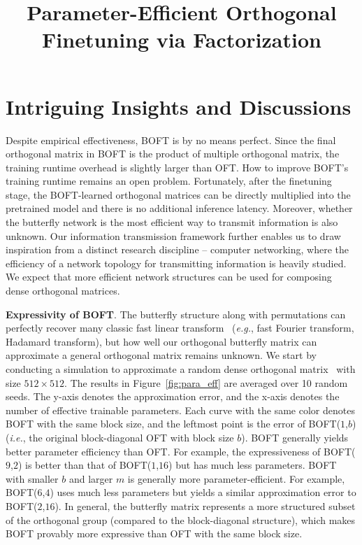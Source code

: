 \title{Parameter-Efficient Orthogonal Finetuning via Factorization}
\section{Intriguing Insights and Discussions}

Despite empirical effectiveness, BOFT is by no means perfect. Since the final orthogonal matrix in BOFT is the product of multiple orthogonal matrix, the training runtime overhead is slightly larger than OFT. How to improve BOFT's training runtime remains an open problem. Fortunately, after the finetuning stage, the BOFT-learned orthogonal matrices can be directly multiplied into the pretrained model and there is no additional inference latency. Moreover, whether the butterfly network is the most efficient way to transmit information is also unknown. Our information transmission framework further enables us to draw inspiration from a distinct research discipline -- computer networking, where the efficiency of a network topology for transmitting information is heavily studied. We expect that more efficient network structures can be used for composing dense orthogonal matrices.



\textbf{Expressivity of BOFT}. The butterfly structure along with permutations can perfectly recover many classic fast linear transform~\cite{dao2019learning,dao2019kaleidoscope} (\emph{e.g.}, fast Fourier transform, Hadamard transform), but how well our orthogonal butterfly matrix can approximate a general orthogonal matrix remains unknown. We start by conducting a simulation to approximate a random dense orthogonal matrix~\cite{anderson1987generation} with size $512\times 512$. The results in Figure~\ref{fig:para_eff} are averaged over 10 random seeds. The y-axis denotes the approximation error, and the x-axis denotes the number of effective trainable parameters. Each curve with the same color denotes BOFT with the same block size, and the leftmost point is the error of BOFT($1$,$b$) (\emph{i.e.}, the original block-diagonal OFT with block size $b$). BOFT generally yields better parameter efficiency than OFT. For example, the expressiveness of BOFT($9$,$2$) is better than that of BOFT($1$,$16$) but has much less parameters. BOFT with smaller $b$ and larger $m$ is generally more parameter-efficient. For example, BOFT($6$,$4$) uses much less parameters but yields a similar approximation error to BOFT($2$,$16$). In general, the butterfly matrix represents a more structured subset of the orthogonal group (compared to the block-diagonal structure), which makes BOFT provably more expressive than OFT with the same block size.

